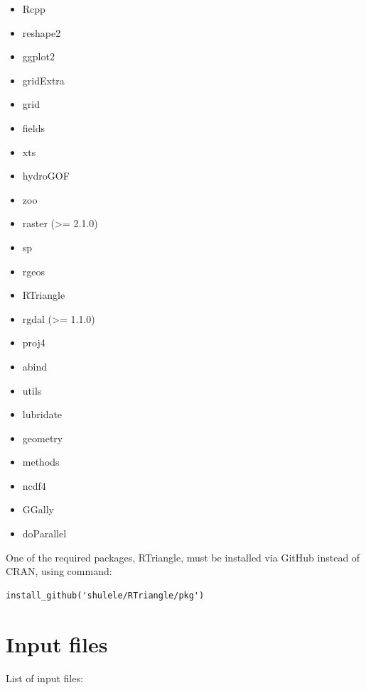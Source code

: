 \documentclass[
]{scrbook}
\providecommand{\tightlist}{%
  \setlength{\itemsep}{0pt}\setlength{\parskip}{0pt}}
\begin{document}
\begin{itemize}
\tightlist
\item
  Rcpp
\item
  reshape2
\item
  ggplot2
\item
  gridExtra
\item
  grid
\item
  fields
\item
  xts
\item
  hydroGOF
\item
  zoo
\item
  raster (\textgreater= 2.1.0)
\item
  sp
\item
  rgeos
\item
  RTriangle
\item
  rgdal (\textgreater= 1.1.0)
\item
  proj4
\item
  abind
\item
  utils
\item
  lubridate
\item
  geometry
\item
  methods
\item
  ncdf4
\item
  GGally
\item
  doParallel
\end{itemize}

One of the required packages, RTriangle, must be installed via GitHub instead of CRAN, using command:

\begin{verbatim}
install_github('shulele/RTriangle/pkg') 
\end{verbatim}

\hypertarget{input-files}{%
\chapter{Input files}\label{input-files}}

List of input files:
\end{document}
